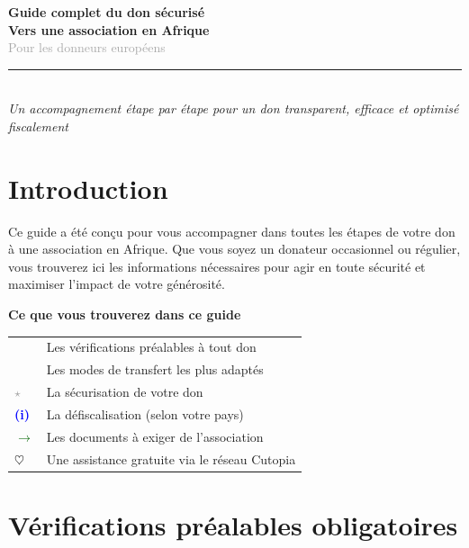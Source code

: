 \documentclass[12pt, a4paper]{article}
\newcommand{\cmark}{\textcolor{darkgreen}{\textbf{\checkmark}}}
\newcommand{\arrow}{\textcolor{darkgreen}{\textbf{$\rightarrow$}}}
\newcommand{\heart}{\textcolor{cutopia}{\textbf{$\heartsuit$}}}
\newcommand{\starred}{\textcolor{darkgray}{\textbf{$\star$}}}
\newcommand{\euro}{\textcolor{darkgreen}{\textbf{\EUR}}}
\newcommand{\info}{\textcolor{blue}{\textbf{(i)}}}
\begin{document}
\begin{center}
    {\Huge \textbf{Guide complet du don sécurisé}} \\[0.3cm]
    {\Large \textbf{Vers une association en Afrique}} \\[0.3cm]
    {\large \textcolor{darkgray}{Pour les donneurs européens}} \\[0.5cm]
    \rule{0.7\textwidth}{0.4pt} \\[0.3cm]
    \textit{Un accompagnement étape par étape pour un don transparent, efficace et optimisé fiscalement}
\end{center}

\vspace{0.5cm}

\tableofcontents
\newpage

\section*{Introduction}
Ce guide a été conçu pour vous accompagner dans toutes les étapes de votre don à une association en Afrique. Que vous soyez un donateur occasionnel ou régulier, vous trouverez ici les informations nécessaires pour agir en toute sécurité et maximiser l'impact de votre générosité.

\vspace{0.3cm}
\begin{resumebox}
    \centering
    \textbf{\Large Ce que vous trouverez dans ce guide} \\[0.3cm]
    \begin{tabular}{ll}
        \cmark & Les vérifications préalables à tout don \\
        \euro & Les modes de transfert les plus adaptés \\
        \starred & La sécurisation de votre don \\
        \info & La défiscalisation (selon votre pays) \\
        \arrow & Les documents à exiger de l'association \\
        \heart & Une assistance gratuite via le réseau Cutopia
    \end{tabular}
\end{resumebox}
\vspace{0.3cm}

\newpage

\section{Vérifications préalables obligatoires}
\end{document}
